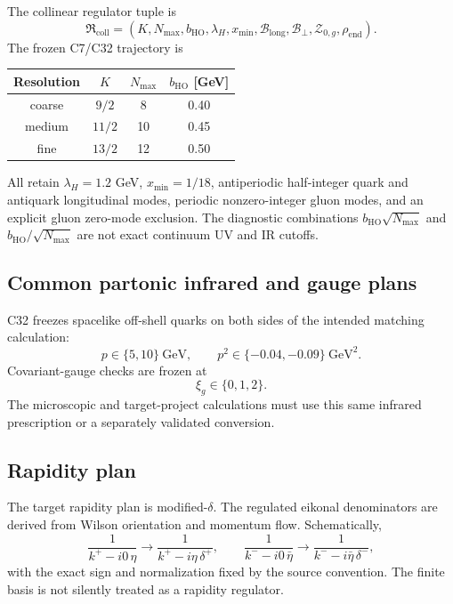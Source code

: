 \documentclass[11pt]{article}
\newcommand{\cZ}{\mathcal Z}
\newcommand{\cB}{\mathcal B}
\newcommand{\Coll}{\ensuremath{\mathrm{coll}}}
\begin{document}
The collinear regulator tuple is
\begin{equation}
 \mathfrak R_{\Coll}
 =
 \left(
 K,N_{\max},b_{\mathrm{HO}},
 \lambda_H,x_{\min},
 \cB_{\mathrm{long}},
 \cB_{\perp},
 \cZ_{0,g},
 \rho_{\mathrm{end}}
 \right).
 \label{eq:coll-regulator}
\end{equation}
The frozen C7/C32 trajectory is
\begin{center}
\begin{tabular}{cccc}
\toprule
Resolution & \(K\) & \(N_{\max}\) & \(b_{\mathrm{HO}}\) [GeV]\\
\midrule
coarse & \(9/2\) & 8 & 0.40\\
medium & \(11/2\) & 10 & 0.45\\
fine & \(13/2\) & 12 & 0.50\\
\bottomrule
\end{tabular}
\end{center}
All retain \(\lambda_H=1.2\) GeV, \(x_{\min}=1/18\), antiperiodic half-integer quark and antiquark longitudinal modes, periodic nonzero-integer gluon modes, and an explicit gluon zero-mode exclusion.  The diagnostic combinations \(b_{\mathrm{HO}}\sqrt{N_{\max}}\) and \(b_{\mathrm{HO}}/\sqrt{N_{\max}}\) are not exact continuum UV and IR cutoffs.

\subsection{Common partonic infrared and gauge plans}

C32 freezes spacelike off-shell quarks on both sides of the intended matching calculation:
\begin{equation}
 p\in\{5,10\}\ \mathrm{GeV},
 \qquad
 p^2\in\{-0.04,-0.09\}\ \mathrm{GeV}^2.
 \label{eq:ir-plan}
\end{equation}
Covariant-gauge checks are frozen at
\begin{equation}
 \xi_g\in\{0,1,2\}.
 \label{eq:gauge-plan}
\end{equation}
The microscopic and target-project calculations must use this same infrared prescription or a separately validated conversion.

\subsection{Rapidity plan}

The target rapidity plan is modified-\(\delta\).  The regulated eikonal denominators are derived from Wilson orientation and momentum flow.  Schematically,
\begin{equation}
 \frac{1}{k^+ - i0\,\eta}
 \longrightarrow
 \frac{1}{k^+ - i\eta\,\delta^+},
 \qquad
 \frac{1}{k^- - i0\,\bar\eta}
 \longrightarrow
 \frac{1}{k^- - i\bar\eta\,\delta^-},
 \label{eq:modified-delta}
\end{equation}
with the exact sign and normalization fixed by the source convention.  The finite basis is not silently treated as a rapidity regulator.
\end{document}
